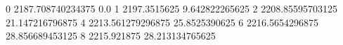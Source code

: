 0 2187.708740234375 0.0
1 2197.3515625 9.642822265625
2 2208.85595703125 21.147216796875
4 2213.561279296875 25.8525390625
6 2216.5654296875 28.856689453125
8 2215.921875 28.213134765625
